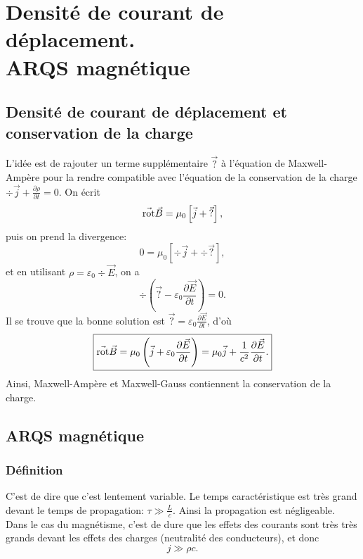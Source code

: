 \section[Densité de courant de déplacement]{Densité de courant de déplacement.\texorpdfstring{\\}{ }ARQS magnétique}
\subsection{Densité de courant de déplacement et conservation de la charge}

L'idée est de rajouter un terme supplémentaire $\vec{?}$ à l'équation de Maxwell-Ampère pour la rendre compatible avec l'équation de la conservation de la charge $\div\vec{j}+\frac{\partial\rho}{\partial t}=0$.
On écrit 
\begin{equation}
    \vec{\mathrm{rot}}\vec{B}=\mu_0\left[\vec{j}+\vec{?}\right],
\end{equation}
puis on prend la divergence:
\begin{equation}
    0=\mu_0\left[\div\vec{j}+\div\vec{?}\right],
\end{equation}
et en utilisant $\rho=\varepsilon_0\div\vec{E}$, on a 
\begin{equation}
    \div\left(\vec{?}-\varepsilon_0\frac{\partial\vec{E}}{\partial t}\right)=0.
\end{equation}
Il se trouve que la bonne solution est $\vec{?}=\varepsilon_0\frac{\partial\vec{E}}{\partial t}$, d'où
\begin{equation}
    \boxed{
        \vec{\mathrm{rot}}\vec{B}=\mu_0\left(\vec{j}+\varepsilon_0\frac{\partial\vec{E}}{\partial t}\right)=\mu_0\vec{j}+\frac{1}{c^{2}}\frac{\partial\vec{E}}{\partial t}.
    }
\end{equation}
Ainsi, Maxwell-Ampère et Maxwell-Gauss contiennent la conservation de la charge.

\subsection{ARQS magnétique}
\subsubsection{Définition}
C'est de dire que c'est \og lentement variable\fg. Le temps caractéristique est très grand devant le temps de propagation: $\tau\gg\frac{L}{c}$. Ainsi la propagation est négligeable. Dans le cas du magnétisme, c'est de dure que les effets des courants sont très très grands devant les effets des charges (neutralité des conducteurs), et donc 
\begin{equation}
    \boxed{
        j\gg\rho c.
    }
\end{equation}


